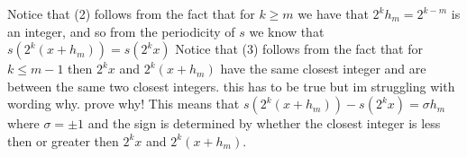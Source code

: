 \documentclass[12pt]{amsart}
\begin{document}
\begin{itemize}
      Notice that (2) follows from the fact that for $k\geq m$ we have that $2^kh_m=2^{k-m}$ is an integer, and so from the periodicity of $s$ we know that $s(2^k(x+h_m))=s(2^kx)$
      Notice that (3) follows from the fact that for $k\leq m-1$ then $2^{k}x$ and $2^{k}(x+h_m)$ have the same closest integer and are between the 
      same two closest integers. this has to be true but im struggling with wording why. prove why!
      This means that $s(2^k(x+h_m))-s(2^kx)=\sigma h_m$ where $\sigma=\pm 1$ and the sign is determined by whether the closest integer 
      is less then or greater then $2^{k}x$ and $2^{k}(x+h_m)$.








\end{itemize}
\end{document}
